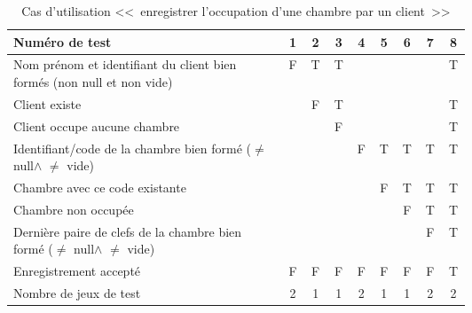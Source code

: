 \documentclass[11pt,article]{article}
\newcommand{\nullvalue}{\textsf{null}\xspace}
\begin{document}
        \begin{table}[htbp!]
            \begin{tabular}{|p{0.6\linewidth}|c|c|c|c|c|c|c|c|}
                \hline
                Numéro de test
                    &1&2&3&4&5&6&7&8\\
                \hline
                \hline
                Nom prénom et identifiant du client bien formés (non \nullvalue et non vide)
                    &F&T&T& & & & &T\\
                \hline
                Client existe
                    & &F&T& & & & &T\\
                \hline
                Client occupe aucune chambre
                    & & &F& & & & &T\\
                \hline
                \hline
                Identifiant/code de la chambre bien formé ($\neq$ \nullvalue $\land$ $\neq$ vide)
                    & & & &F&T&T&T&T\\
                \hline
                Chambre avec ce code existante
                    & & & & &F&T&T&T\\
                \hline
                Chambre non occupée
                    & & & & & &F&T&T\\
                \hline
                Dernière paire de clefs de la chambre bien formé ($\neq$ \nullvalue $\land$ $\neq$ vide)
                    & & & & & & &F&T\\
                \hline
                \hline
                Enregistrement accepté
                    &F&F&F&F&F&F&F&T\\
                \hline
                \hline
                Nombre de jeux de test
                                    &2&1&1&2&1&1&2&2 \\
                \hline
            \end{tabular}
            \caption{Cas d'utilisation <<~enregistrer l'occupation d'une chambre par un client~>>}
        \end{table}
\end{document}
